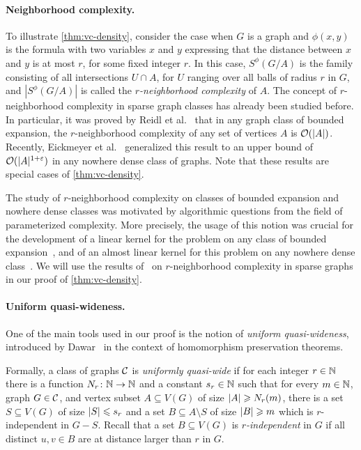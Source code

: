 \paragraph{Neighborhood complexity.}
To illustrate \cref{thm:vc-density}, consider the case when
$G$ is a graph and  $\phi(x,y)$ is the formula with two variables $x$ and $y$ expressing that the distance between $x$ and $y$
is at most $r$, for some fixed integer $r$. In this case, $S^\phi(G/A)$ is the family consisting of all intersections $U\cap A$, for $U$ ranging over all balls of radius $r$ in $G$,
and  $|S^\phi(G/A)|$ is called the \emph{$r$-neighborhood complexity} of $A$.
The concept of $r$-neighborhood complexity in sparse graph classes has already been studied before.
In particular, it was proved by Reidl et al.~\cite{reidl2016characterising} that in any graph class of bounded expansion, the $r$-neighborhood complexity of any set of vertices $A$ is $\mathcal{O}(|A|)$.
Recently, Eickmeyer et al.~\cite{eickmeyer2016neighborhood} generalized this result to an upper bound of $\mathcal{O}(|A|^{1+\varepsilon})$ in any nowhere dense class of graphs.
Note that these results are special cases of \cref{thm:vc-density}.

The study of $r$-neighborhood complexity on classes of bounded expansion and nowhere dense classes was motivated by algorithmic questions from the field of parameterized complexity.
More precisely, the usage of this notion was crucial for the development of a linear kernel for the {} problem on any class of bounded expansion~\cite{drange2016kernelization},
and of an almost linear kernel for this problem on any nowhere dense class~\cite{eickmeyer2016neighborhood}.
We will use the results of~\cite{drange2016kernelization,eickmeyer2016neighborhood,reidl2016characterising} on $r$-neighborhood complexity in sparse graphs in our proof of \cref{thm:vc-density}.

\paragraph{Uniform quasi-wideness.}
One of the main tools used in our proof 
is the notion of \emph{uniform quasi-wideness},
introduced by Dawar~\cite{dawar2010homomorphism}
in the context of homomorphism preservation theorems.

Formally, a class of graphs $\mathcal{C}$  is \emph{uniformly quasi-wide} if for each integer $r\in\mathbb{N}$ there is a function
 $N_r\colon \mathbb{N}\rightarrow \mathbb{N}$ and a constant  $s_r\in \mathbb{N}$ such
that for every $m\in \mathbb{N}$, graph $G\in \mathcal{C}$, and vertex subset $A\subseteq V(G)$ of size $\left\lvert A\right\rvert\geqslant N_r(m)$,
there is a set $S\subseteq V(G)$ of size $\left\lvert S\right\rvert\leqslant s_r$ and a set
$B\subseteq A\setminus S$ of size $\left\lvert B\right\rvert\geqslant m$ which is $r$-independent in
$G-S$. Recall that a set $B\subseteq V(G)$ is {\em{$r$-independent}} in $G$ if all
distinct $u,v\in B$ are at distance 
larger than $r$ in $G$.

